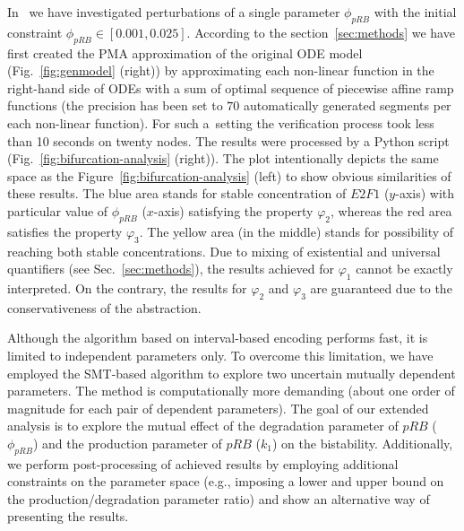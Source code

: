 \documentclass{llncs}
\begin{document}
In~\cite{CMSB15} we have investigated perturbations of a single parameter $\phi_{pRB}$ with the initial constraint $\phi_{pRB} \in [0.001,0.025]$. According to the section~\ref{sec:methods} we have first created the PMA approximation of the original ODE model (Fig.~\ref{fig:genmodel} (right)) by approximating each non-linear function in the right-hand side of ODEs with a sum of optimal sequence of piecewise affine ramp functions (the precision has been set to $70$ automatically generated segments per each non-linear function). For such a~setting the verification process took less than 10 seconds on twenty nodes.
The results were processed by a Python script 
(Fig.~\ref{fig:bifurcation-analysis} (right)). The plot intentionally depicts the same space as the Figure~\ref{fig:bifurcation-analysis} (left) to 
show obvious similarities of these results. %
The blue area stands for stable concentration of $E2F1$ ($y$-axis) with particular value of $\phi_{pRB}$ ($x$-axis) satisfying the property $\varphi_2$, whereas the red area satisfies the property $\varphi_3$. The yellow area (in the middle) stands for possibility of reaching both stable concentrations. 
Due to mixing of existential and universal quantifiers (see Sec.~\ref{sec:methods}), the results achieved for $\varphi_1$ cannot be exactly interpreted. On the contrary, the results for $\varphi_2$ and $\varphi_3$ are guaranteed due to the conservativeness of the abstraction. %

Although the algorithm based on interval-based encoding performs fast, it is limited to independent parameters only. To overcome this limitation, we have employed the SMT-based algorithm to explore two uncertain mutually dependent parameters. The method is computationally more demanding (about one order of magnitude for each pair of dependent parameters). The goal of our extended analysis is to explore the mutual effect of the degradation parameter of $pRB$ ($\phi_{pRB}$) and the production parameter of $pRB$ ($k_1$) on the bistability. Additionally, we perform post-processing of achieved results by employing additional constraints on the parameter space (e.g., imposing a lower and upper bound on the production/degradation parameter ratio) and show an alternative way of presenting the results.
\end{document}
